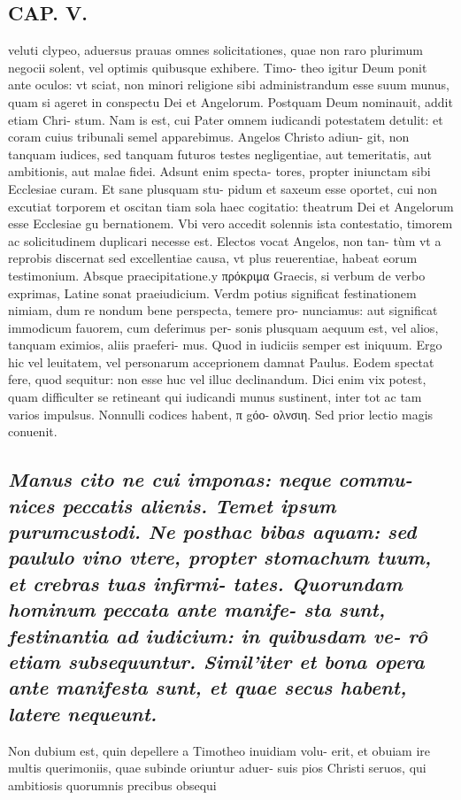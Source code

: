 \documentclass{article}
\begin{document}
\begin{pages}
\section*{CAP. V. }
\marginpar{[ p.69 ]}\pstart veluti clypeo, aduersus prauas omnes solicitationes, quae non raro plurimum negocii solent, vel optimis quibusque exhibere. Timo- theo igitur Deum ponit ante oculos: vt sciat, non minori religione sibi administrandum esse suum munus, quam si ageret in conspectu Dei et Angelorum. Postquam Deum nominauit, addit etiam Chri- stum. Nam is est, cui Pater omnem iudicandi potestatem detulit: et coram cuius tribunali semel apparebimus. Angelos Christo adiun- git, non tanquam iudices, sed tanquam futuros testes negligentiae, aut temeritatis, aut ambitionis, aut malae fidei. Adsunt enim specta- tores, propter iniunctam sibi Ecclesiae curam. Et sane plusquam stu- pidum et saxeum esse oportet, cui non excutiat torporem et oscitan tiam sola haec cogitatio: theatrum Dei et Angelorum esse Ecclesiae gu bernationem. Vbi vero accedit solennis ista contestatio, timorem ac solicitudinem duplicari necesse est. Electos vocat Angelos, non tan- tùm vt a reprobis discernat sed excellentiae causa, vt plus reuerentiae, habeat eorum testimonium.  \pend\pstart Absque praecipitatione.y πρόκριμα Graecis, si verbum de verbo exprimas, Latine sonat praeiudicium. Verdm potius significat festinationem nimiam, dum re nondum bene perspecta, temere pro- nunciamus: aut significat immodicum fauorem, cum deferimus per- sonis plusquam aequum est, vel alios, tanquam eximios, aliis praeferi- mus. Quod in iudiciis semper est iniquum. Ergo hic vel leuitatem, vel personarum acceprionem damnat Paulus. Eodem spectat fere, quod sequitur: non esse huc vel illuc declinandum. Dici enim vix potest, quam difficulter se retineant qui iudicandi munus sustinent, inter tot ac tam varios impulsus. Nonnulli codices habent, π gόο- ολνσιη. Sed prior lectio magis conuenit.  \pend
{}
{}
\subsection*{\textit{Manus cito ne cui imponas: neque commu- nices peccatis alienis. Temet ipsum purumcustodi. Ne posthac bibas aquam: sed paululo vino vtere, propter stomachum tuum, et crebras tuas infirmi- tates. Quorundam hominum peccata ante manife- sta sunt, festinantia ad iudicium: in quibusdam ve- rô etiam subsequuntur. Simil’iter et bona opera ante manifesta sunt, et quae secus habent, latere nequeunt. }}\pstart Non dubium est, quin depellere a Timotheo inuidiam volu- erit, et obuiam ire multis querimoniis, quae subinde oriuntur aduer- suis pios Christi seruos, qui ambitiosis quorumnis precibus obsequi  \pend

\end{pages}
\end{document}
